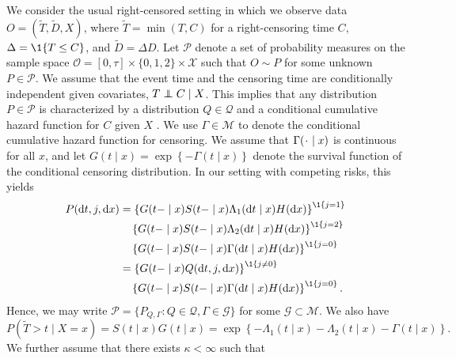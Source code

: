\documentclass[a4,danish]{article}
\begin{document}
We consider the usual right-censored setting in which we observe data
\(O = (\tilde{T},\tilde D, X)\), where $\tilde T = \min(T,C)$ for a
right-censoring time \(C\), $\Delta = \1{\{T \leq C\}}$, and
\(\tilde D=\Delta D\). Let \(\mathcal{P}\) denote a set of probability measures
on the sample space
\(\mathcal{O} = [0, \tau] \times \{0, 1, 2\} \times \mathcal{X}\) such that
\(O \sim P \) for some unknown \(P\in \mathcal{P}\). We assume that the event
time and the censoring time are conditionally independent given covariates,
\( T \independent C \mid X \). This implies that any distribution
\( P \in \mathcal{P} \) is characterized by a distribution
\( Q \in \mathcal{Q} \) and a conditional cumulative hazard function for \( C \)
given \( X \) \citep[c.f.,][]{begun1983information,gill1997coarsening}. We use
\(\Gamma\in\mathcal M\) to denote the conditional cumulative hazard function for
censoring. We assume that \( \Gamma(\blank \mid x) \) is continuous for all
\( x \), and let \(G(t \mid x)=\exp\left\{-\Gamma(t \mid x)\right\}\) denote the
survival function of the conditional censoring distribution. In our setting with
competing risks, this yields
\begin{equation}\label{eq:parametrizeP}
  \begin{split}
    P(\diff t, j, \diff x) &= \left\{G(t- \mid x)S(t- \mid x)\Lambda_1(\diff t \mid x)H(\diff x)\right\}^{\1{{\{j=1\}}}}\\
                           &\quad\left\{G(t- \mid x)S(t- \mid x)\Lambda_2(\diff t \mid x)H(\diff x)\right\}^{\1{{\{j=2\}}}}\\
                           &\quad\left\{G(t- \mid x)S(t- \mid x)\Gamma(\diff t \mid x)H(\diff x)\right\}^{\1{{\{j=0\}}}}\\
                           &=\left\{G(t- \mid x)Q(\diff t,j,\diff x)\right\}^{\1{{\{j\ne 0\}}}}\\    
                           &\quad\left\{G(t- \mid x)S(t- \mid x)\Gamma(\diff t \mid x)H(\diff x)\right\}^{\1{{\{j=0\}}}}.
  \end{split}
\end{equation}
Hence, we may write
\( \mathcal{P} = \{ P_{Q, \Gamma} : Q \in \mathcal{Q}, \Gamma \in
\mathcal{G} \} \) for some \( \mathcal{G} \subset \mathcal{M} \). We
also have
\begin{equation*}
P(\tilde T>t \mid X=x) = S(t \mid x)G(t \mid x) = \exp\left\{-\Lambda_{1}(t \mid x)-\Lambda_{2}(t \mid x)-\Gamma(t \mid x) \right\}.
\end{equation*}
We further assume that there exists \(\kappa<\infty\) such that
\end{document}
